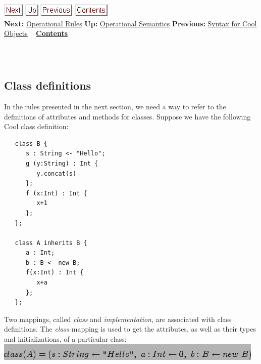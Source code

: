 \documentclass[]{article}
\begin{document}
\href{node48.html}{\includegraphics{next.png}}
\href{node44.html}{\includegraphics{up.png}}
\href{node46.html}{\includegraphics{prev.png}}
\href{node1.html}{\includegraphics{contents.png}} \\ \textbf{Next:}
\href{node48.html}{Operational Rules} \textbf{Up:}
\href{node44.html}{Operational Semantics} \textbf{Previous:}
\href{node46.html}{Syntax for Cool Objects} ~
\textbf{\href{node1.html}{Contents}} \\ \\

\subsection{\\ Class definitions}

In the rules presented in the next section, we need a way to refer to
the definitions of attributes and methods for classes. Suppose we have
the following Cool class definition:

\begin{verbatim}
   class B {
      s : String <- "Hello";
      g (y:String) : Int {
         y.concat(s)
      };
      f (x:Int) : Int {
         x+1
      };
   };

   class A inherits B {
      a : Int;
      b : B <- new B;
      f(x:Int) : Int {
         x+a
      };
   };
\end{verbatim}

Two mappings, called \emph{class} and \emph{implementation}, are
associated with class definitions. The \emph{class} mapping is used to
get the attributes, as well as their types and initializations, of a
particular class: \\

\includegraphics{img145.png}
\end{document}
